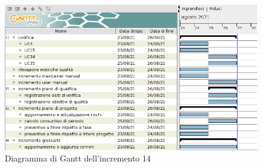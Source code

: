 \begin{figure}[!ht]
    \caption{Diagramma di Gantt dell'incremento 14}
    \vspace{5px}
    \includegraphics[scale=0.3]{../../../Images/Diagrammi/Gantt/incremento14.png}
    \centering
\end{figure}
\pagebreak
